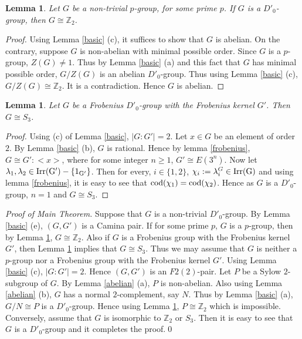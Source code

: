 \documentclass[12pt, oneside, a4paper]{article}
\newtheorem{lemma}[theorem]{Lemma}
\theoremstyle{definition}
\begin{document}
\begin{lemma}\label{cyclic}
Let $G$ be a non-trivial $p$-group, for some prime $p$. If $G$ is a $D'_0$-group, then $G\cong \mathbb{Z}_2$.
\end{lemma}

\begin{proof}
 Using Lemma \ref{basic} (c), it suffices to show that  $G$ is abelian. On the contrary, suppose $G$ is non-abelian with minimal possible order. Since $G$ is a $p$-group, $Z(G)\neq 1$. Thus by Lemma \ref{basic} (a) and this fact that $G$ has minimal possible order, $G/Z(G)$ is an abelian $D'_0$-group. Thus using Lemma \ref{basic} (c), $G/Z(G)\cong \mathbb{Z}_2$. It is a contradiction. Hence $G$ is abelian.
\end{proof}

\begin{lemma}\label{symetric}
Let $G$ be a Frobenius $D'_0$-group with the Frobenius kernel $G'$. Then $G\cong S_3$.
\end{lemma}

\begin{proof}
 Using  (c) of Lemma \ref{basic}, $|G:G'|=2$. Let $x\in G$ be an element of order $2$. By Lemma \ref{basic} (b), $G$ is rational. Hence by lemma  \ref{frobenius},  $G\cong G':<x>$, where for some integer $n\geqslant 1$, $G'\cong E(3^n)$. Now let $\lambda_1,\lambda_2 \in  \rm{Irr}(G')-\{1_{G'}\}$. Then for every, $i\in\{1,2\}$, $\chi_i:=\lambda_i^G \in \rm{Irr}(G)$ and using lemma \ref{frobenius}, it is easy to see that $\rm{cod}(\chi_1)=\rm{cod}(\chi_2)$. Hence as $G$ is a $D'_0$-group, $n=1$ and $G\cong S_3$.
\end{proof}

\noindent \textit{Proof of Main Theorem.} Suppose that $G$ is a non-trivial $D'_0$-group. By Lemma \ref{basic} (e), $(G,G')$ is a Camina pair. If for some prime $p$, $G$ is a $p$-group, then by Lemma \ref{cyclic}, $G\cong \mathbb{Z}_2$. Also if $G$ is a Frobenius group with the Frobenius kernel $G'$, then Lemma \ref{symetric} implies that $G\cong S_3$. Thus we may assume that $G$ is neither a $p$-group nor a Frobenius group with the Frobenius kernel $G'$. Using Lemma \ref{basic} (c), $|G:G'|=2$. Hence $(G,G')$ is an $F2(2)$-pair. Let $P$ be a Sylow $2$-subgroup of $G$. By Lemma \ref{abelian} (a), $P$ is non-abelian. Also using Lemma \ref{abelian} (b), $G$ has a normal $2$-complement, say $N$. Thus by Lemma \ref{basic} (a), $G/N\cong P$ is a $D'_0$-group. Hence using Lemma \ref{cyclic}, $P\cong \mathbb{Z}_2$ which is impossible. Conversely, assume that $G$ is isomorphic to $\mathbb{Z}_2$ or $S_3$. Then it is easy to see that $G$ is a $D'_0$-group and it completes the proof.\qed
\end{document}
